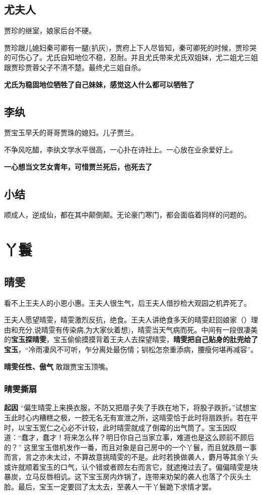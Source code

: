 \documentclass[conference]{IEEEtran}
\begin{document}
\begin{CJK*}{UTF8}{song}
\subsection{尤夫人}
贾珍的继室，娘家后台不硬。

贾珍跟儿媳妇秦可卿有一腿(扒灰)，贾府上下人尽皆知，秦可卿死的时候，贾珍哭的可伤心了。尤氏自知地位不稳，忍耐。并且尤氏带来尤氏双姐妹，尤二姐尤三姐跟贾珍贾蓉父子不清不楚。最终尤三姐自杀。

\textbf{尤氏为稳固地位牺牲了自己妹妹，感觉这人什么都可以牺牲了}

\subsection{李纨}
贾宝玉早夭的哥哥贾珠的媳妇。儿子贾兰。

不争风吃醋，李纨文学水平很高，一心扑在诗社上。一心放在业余爱好上。

\textbf{一心想当文艺女青年，可惜贾兰死后，也死去了}

\subsection{小结}
顺成人，逆成仙，都在其中颠倒颠。无论豪门寒门，都会面临着同样的问题的。





\section{丫鬟}

\subsection{晴雯}
看不上王夫人的小恩小惠。王夫人很生气，后王夫人借抄检大观园之机弄死了。

王夫人愿望晴雯，晴雯激烈反抗，绝食。王夫人讲绝食多天的晴雯赶回娘家（）理由和充分,说晴雯有传染病,为大家伙着想)，晴雯当天气病而死。中间有一段很凄美的\textbf{宝玉探晴雯}，宝玉偷偷摸摸背着王夫人去探望晴雯，\textbf{晴雯把自己贴身的肚兜给了宝玉}，“冷雨凄风不可听，乍分离处最伤情；钏松怎奈重添病，腰瘦何堪再减容”。

\textbf{晴雯任性、傲气} 敢跟贾宝玉顶嘴。

\subsubsection{晴雯撕扇}

\textbf{起因} “偏生晴雯上来换衣服，不防又把扇子失了手跌在地下，将股子跌折。”试想宝玉此时心内糟糕之极，一腔无名无有宣泄之所，这晴雯恰于此时将扇跌折。若在平时，以宝玉宽仁之心必不计较，此时晴雯就成了倒霉的出气筒了。宝玉因叹道：“蠢才，蠢才！将来怎么样？明日你自己当家立事，难道也是这么顾前不顾后的？”
这里宝玉借机发作一番，而且对象是自己房中的一个丫鬟，而且就跌扇一事而言，言之亦未太过，不算故意挑晴雯的不是。此时若换做袭人，麝月等其余丫头或许就顺着宝玉的口气，认个错或者顾左右而言它，就遮掩过去了。偏偏晴雯是块暴炭，立马反唇相讥。这下宝玉房内炸锅了，连带来劝架的袭人也落了个灰头土脸。最后，宝玉一定要回了太太去，至袭人一干丫鬟跪下求情才罢。


\end{CJK*}
\end{document}
